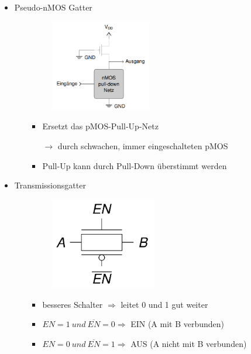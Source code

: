 \documentclass[11pt,a4paper]{article}
\begin{document}
\begin{itemize}
\begin{itemize}
		\item Pseudo-nMOS Gatter
			\begin{itemize}
			\item[]		
				\begin{minipage}{0.25\textwidth}
					\begin{figure}[H]
					\includegraphics[height=4cm]{Bilder/pseudonmos}
					\end{figure}
				\end{minipage}
				\begin{minipage}[t]{0.6\textwidth}
					\vspace{-1.25cm}
					\begin{itemize}
					\item Ersetzt das pMOS-Pull-Up-Netz
					\item[$\rightarrow$] durch schwachen, immer eingeschalteten pMOS
					\item Pull-Up kann durch Pull-Down überstimmt werden
					\end{itemize}
				\end{minipage}
			\end{itemize}
		\item Transmissionsgatter
			\begin{itemize}
			\item[]		
				\begin{minipage}{0.25\textwidth}
					\begin{figure}[H]
					\includegraphics[height=4cm]{Bilder/tgates}
					\end{figure}
				\end{minipage}
				\begin{minipage}[t]{0.6\textwidth}
					\vspace{-1.25cm}
					\begin{itemize}
					\item besseres Schalter $\Rightarrow$ leitet 0 und 1 gut weiter
					\item $EN = 1 ~ und ~ \overline{EN}=0 \Rightarrow$ EIN (A mit B verbunden)
					\item $EN = 0 ~ und ~ \overline{EN}=1 \Rightarrow$ AUS (A nicht mit B verbunden)
					\end{itemize}
				\end{minipage}
			\end{itemize}
	\end{itemize}


\end{itemize}
\end{document}
